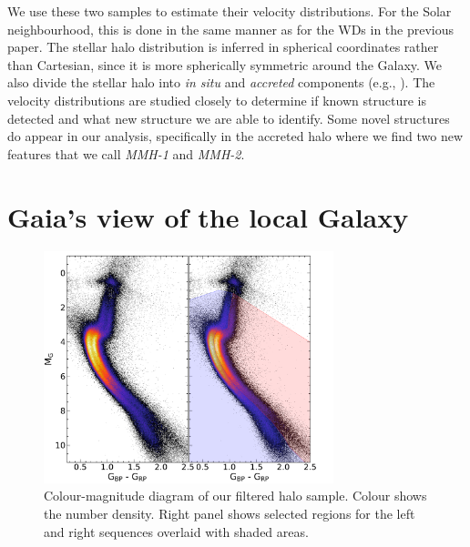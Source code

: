 We use these two samples to estimate their velocity distributions. For the Solar neighbourhood, this is done in the same manner as for the WDs in the previous paper. The stellar halo distribution is inferred in spherical coordinates rather than Cartesian, since it is more spherically symmetric around the Galaxy. We also divide the stellar halo into \textit{in situ} and \textit{accreted} components (e.g., \citealt{naidu:20}). The velocity distributions are studied closely to determine if known structure is detected and what new structure we are able to identify. Some novel structures do appear in our analysis, specifically in the accreted halo where we find two new features that we call \textit{MMH-1} and \textit{MMH-2}.
\section{Gaia's view of the local Galaxy}\label{sec:p3-gaiaview}
\begin{figure}[t]
    \centering
    \includegraphics[width=0.75\textwidth]{images/GES_cmd.pdf}
    \caption{Colour-magnitude diagram of our filtered halo sample. Colour shows the number density. Right panel shows selected regions for the left and right sequences overlaid with shaded areas.} %
    \label{fig:halo_cmd}
\end{figure}
